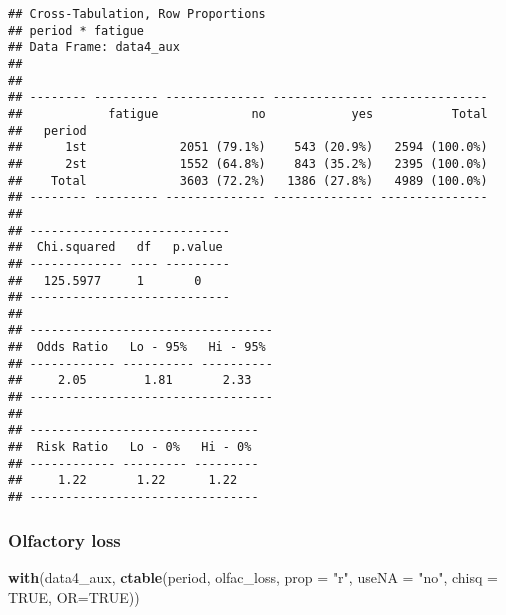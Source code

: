 \documentclass[
]{article}
\newenvironment{Shaded}{\begin{snugshade}}{\end{snugshade}}
\newcommand{\DataTypeTok}[1]{\textcolor[rgb]{0.13,0.29,0.53}{#1}}
\newcommand{\KeywordTok}[1]{\textcolor[rgb]{0.13,0.29,0.53}{\textbf{#1}}}
\newcommand{\NormalTok}[1]{#1}
\newcommand{\OtherTok}[1]{\textcolor[rgb]{0.56,0.35,0.01}{#1}}
\newcommand{\StringTok}[1]{\textcolor[rgb]{0.31,0.60,0.02}{#1}}
\begin{document}
\begin{verbatim}
## Cross-Tabulation, Row Proportions  
## period * fatigue  
## Data Frame: data4_aux  
## 
## 
## -------- --------- -------------- -------------- ---------------
##            fatigue             no            yes           Total
##   period                                                        
##      1st             2051 (79.1%)    543 (20.9%)   2594 (100.0%)
##      2st             1552 (64.8%)    843 (35.2%)   2395 (100.0%)
##    Total             3603 (72.2%)   1386 (27.8%)   4989 (100.0%)
## -------- --------- -------------- -------------- ---------------
## 
## ----------------------------
##  Chi.squared   df   p.value 
## ------------- ---- ---------
##   125.5977     1       0    
## ----------------------------
## 
## ----------------------------------
##  Odds Ratio   Lo - 95%   Hi - 95% 
## ------------ ---------- ----------
##     2.05        1.81       2.33   
## ----------------------------------
## 
## --------------------------------
##  Risk Ratio   Lo - 0%   Hi - 0% 
## ------------ --------- ---------
##     1.22       1.22      1.22   
## --------------------------------
\end{verbatim}

\hypertarget{olfactory-loss-2}{%
\subsubsection{Olfactory loss}\label{olfactory-loss-2}}

\begin{Shaded}
\begin{Highlighting}[]
\KeywordTok{with}\NormalTok{(data4_aux, }\KeywordTok{ctable}\NormalTok{(period, olfac_loss, }\DataTypeTok{prop =} \StringTok{"r"}\NormalTok{, }\DataTypeTok{useNA =} \StringTok{"no"}\NormalTok{, }\DataTypeTok{chisq =} \OtherTok{TRUE}\NormalTok{, }\DataTypeTok{OR=}\OtherTok{TRUE}\NormalTok{))}
\end{Highlighting}
\end{Shaded}
\end{document}

